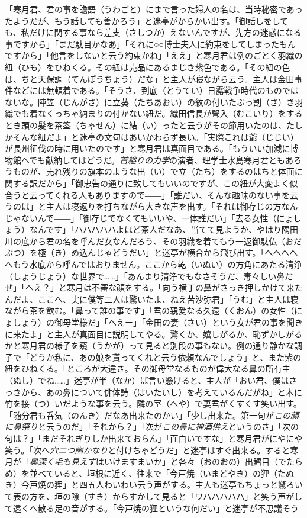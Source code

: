 \documentclass{book}
\begin{document}
「寒月君、君の事を譫語（うわごと）にまで言った婦人の名は、当時秘密であったようだが、もう話しても善かろう」と迷亭がからかい出す。「御話しをしても、私だけに関する事なら差支（さしつか）えないんですが、先方の迷惑になる事ですから」「まだ駄目かなあ」「それに○○博士夫人に約束をしてしまったもんですから」「他言をしないと云う約束かね」「ええ」と寒月君は例のごとく羽織の紐（ひも）をひねくる。その紐は売品にあるまじき紫色である。「その紐の色は、ちと天保調（てんぽうちょう）だな」と主人が寝ながら云う。主人は金田事件などには無頓着である。「そうさ、到底（とうてい）日露戦争時代のものではないな。陣笠（じんがさ）に立葵（たちあおい）の紋の付いたぶっ割（さ）き羽織でも着なくっちゃ納まりの付かない紐だ。織田信長が聟入（むこいり）をするとき頭の髪を茶筌（ちゃせん）に結（い）ったと云うがその節用いたのは、たしかそんな紐だよ」と迷亭の文句はあいかわらず長い。「実際これは爺（じじい）が長州征伐の時に用いたのです」と寒月君は真面目である。「もういい加減に博物館へでも献納してはどうだ。\emph{首縊りの力学}の演者、理学士水島寒月君ともあろうものが、売れ残りの旗本のような出（い）で立（たち）をするのはちと体面に関する訳だから」「御忠告の通りに致してもいいのですが、この紐が大変よく似合うと云ってくれる人もありますので――」「誰だい、そんな趣味のない事を云うのは」と主人は寝返りを打ちながら大きな声を出す。「それは御存じの方なんじゃないんで――」「御存じでなくてもいいや、一体誰だい」「去る女性（にょしょう）なんです」「ハハハハハよほど茶人だなあ、当てて見ようか、やはり隅田川の底から君の名を呼んだ女なんだろう、その羽織を着てもう一返御駄仏（おだぶつ）を極（き）め込んじゃどうだい」と迷亭が横合から飛び出す。「へへへへへもう水底から呼んではおりません。ここから乾（いぬい）の方角にあたる清浄（しょうじょう）な世界で\ldots{}\ldots{}」「あんまり清浄でもなさそうだ、毒々しい鼻だぜ」「へえ？」と寒月は不審な顔をする。「向う横丁の鼻がさっき押しかけて来たんだよ、ここへ、実に僕等二人は驚いたよ、ねえ苦沙弥君」「うむ」と主人は寝ながら茶を飲む。「鼻って誰の事です」「君の親愛なる久遠（くおん）の女性（にょしょう）の御母堂様だ」「へえー」「金田の妻（さい）という女が君の事を聞きに来たよ」と主人が真面目に説明してやる。驚くか、嬉しがるか、恥ずかしがるかと寒月君の様子を窺（うかが）って見ると別段の事もない。例の通り静かな調子で「どうか私に、あの娘を貰ってくれと云う依頼なんでしょう」と、また紫の紐をひねくる。「ところが大違さ。その御母堂なるものが偉大なる鼻の所有主（ぬし）でね\ldots{}\ldots{}」迷亭が半（なか）ば言い懸けると、主人が「おい君、僕はさっきから、あの鼻について俳体詩（はいたいし）を考えているんだがね」と木に竹を接（つ）いだような事を云う。隣の室（へや）で妻君がくすくす笑い出す。「随分君も呑気（のんき）だなあ出来たのかい」「少し出来た。第一句が\emph{この顔に鼻祭り}と云うのだ」「それから？」「次が\emph{この鼻に神酒供え}というのさ」「次の句は？」「まだそれぎりしか出来ておらん」「面白いですな」と寒月君がにやにや笑う。「次へ\emph{穴二つ幽かなり}と付けちゃどうだ」と迷亭はすぐ出来る。すると寒月が「\emph{奥深く毛も見えず}はいけますまいか」と各々（おのおの）出鱈目（でたらめ）を並べていると、垣根に近く、往来で「今戸焼（いまどやき）の狸（たぬき）今戸焼の狸」と四五人わいわい云う声がする。主人も迷亭もちょっと驚ろいて表の方を、垣の隙（すき）からすかして見ると「ワハハハハハ」と笑う声がして遠くへ散る足の音がする。「今戸焼の狸というな何だい」と迷亭が不思議そう
\end{document}
